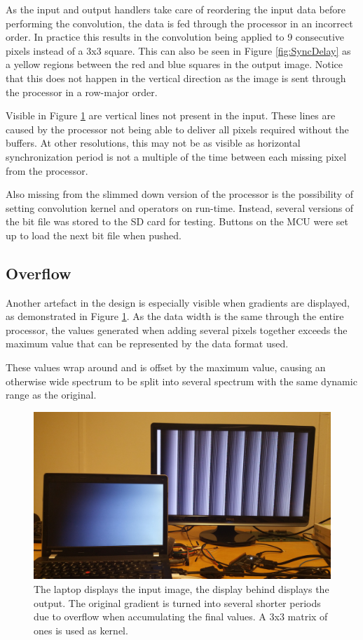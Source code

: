 As the input and output handlers take care of reordering the input data before performing the convolution, the data is fed through the processor in an incorrect order.
In practice this results in the convolution being applied to 9 consecutive pixels instead of a 3x3 square.
This can also be seen in Figure \ref{fig:SyncDelay} as a yellow regions between the red and blue squares in the output image.
Notice that this does not happen in the vertical direction as the image is sent through the processor in a row-major order.

Visible in Figure \ref{fig:Overflow} are vertical lines not present in the input.
These lines are caused by the processor not being able to deliver all pixels required without the buffers.
At other resolutions, this may not be as visible as horizontal synchronization period is not a multiple of the time between each missing pixel from the processor.

Also missing from the slimmed down version of the processor is the possibility of setting convolution kernel and operators on run-time.
Instead, several versions of the bit file was stored to the SD card for testing.
Buttons on the MCU were set up to load the next bit file when pushed.

\subsection{Overflow}
Another artefact in the design is especially visible when gradients are displayed, as demonstrated in Figure \ref{fig:Overflow}.
As the data width is the same through the entire processor, the values generated when adding several pixels together exceeds the maximum value that can be represented by the data format used.

These values wrap around and is offset by the maximum value, causing an otherwise wide spectrum to be split into several spectrum with the same dynamic range as the original.

\begin{figure}
    \centering
    \includegraphics[width=14cm]{img/gradient_test}
    \caption[The laptop displays the input image, the display behind displays the output.]{
        The laptop displays the input image, the display behind displays the output.
        The original gradient is turned into several shorter periods due to overflow when accumulating the final values.
        A 3x3 matrix of ones is used as kernel.
    }
    \label{fig:Overflow}

\end{figure}


